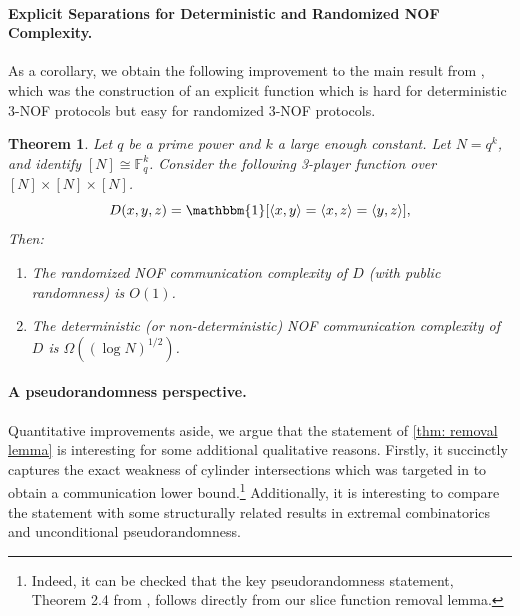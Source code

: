 \documentclass[11pt]{article}
\newtheorem{theorem}{Theorem}[section]
\newcommand{\F}{\mathbb{F}}
\newcommand{\1}{ \mathbbm{1}}
\newcommand{\ip}[2]{\left\langle#1 ,#2 \right\rangle}
\begin{document}
\paragraph{Explicit Separations for Deterministic and Randomized NOF Complexity.}
As a corollary, we obtain the following improvement to the main result from \cite{KelleyLM2024-nof}, which was the construction of an explicit function which is hard for deterministic 3-NOF protocols but easy for randomized 3-NOF protocols. 

\begin{theorem}\label{thm: main nof lb}
Let $q$ be a prime power and $k$ a large enough constant. Let $N=q^k$, and identify $[N] \cong \F_q^k$. Consider the following 3-player function over $[N] \times [N] \times [N]$. 
$$
D(x,y,z) = \1[\ip{x}{y}=\ip{x}{z}=\ip{y}{z}],
$$
Then:
\begin{enumerate}
    \item The randomized NOF communication complexity of $D$ (with public randomness) is $O(1)$.
    \item The deterministic (or non-deterministic) NOF communication complexity of $D$ is $\Omega((\log N)^{1/2})$.
\end{enumerate}
\end{theorem}


\paragraph*{A pseudorandomness perspective.} Quantitative improvements aside, we argue that the statement of \cref{thm: removal lemma} is interesting for some additional qualitative reasons. 
Firstly, it succinctly captures the exact weakness of cylinder intersections which was targeted in \cite{KelleyLM2024-nof} to obtain a communication lower bound.\footnote{Indeed, it can be checked that the key pseudorandomness statement, Theorem 2.4 from \cite{KelleyLM2024-nof}, follows directly from our slice function removal lemma.}
Additionally, it is interesting to compare the statement with some structurally related results in extremal combinatorics and unconditional pseudorandomness. 
\end{document}
